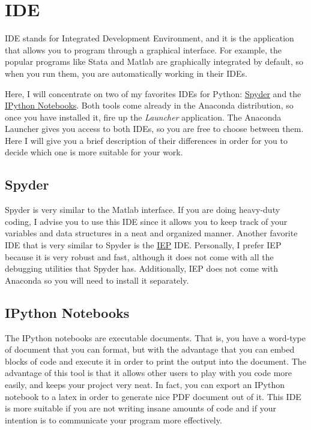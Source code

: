 \documentclass[11pt]{article}
\begin{document}
\section{IDE}

IDE stands for Integrated Development Environment, and it is the application that allows you to program through a graphical interface. For example, the popular programs like Stata and Matlab are graphically integrated by default, so when you run them, you are automatically working in their IDEs.
 
Here, I will concentrate on two of my favorites IDEs for Python: \href{https://pypi.python.org/pypi/spyder}{Spyder} and the \href{http://ipython.org/notebook.html}{IPython Notebooks}. Both tools come already in the Anaconda distribution, so once you have installed it, fire up the \emph{Launcher} application. The Anaconda Launcher gives you access to both IDEs, so you are free to choose between them. Here I will give you a brief description of their differences in order for you to decide which one is more suitable for your work.


\subsection{Spyder}
Spyder is very similar to the Matlab interface. If you are doing heavy-duty coding, I advise you to use this IDE since it allows you to keep track of your variables and data structures in a neat and organized manner. Another favorite IDE that is very similar to Spyder is the \href{http://www.iep-project.org/}{IEP} IDE. Personally, I prefer IEP because it is very robust and fast, although it does not come with all the debugging utilities that Spyder has. Additionally, IEP does not come with Anaconda so you will need to install it separately.


\subsection{IPython Notebooks}

The IPython notebooks are executable documents. That is, you have a word-type of document that you can format, but with the advantage that you can embed blocks of code and execute it in order to print the output into the document. The advantage of this tool is that it allows other users to play with you code more easily, and keeps your project very neat. In fact, you can export an IPython notebook to a latex in order to generate nice PDF document out of it. This IDE is more suitable if you are not writing insane amounts of code and if your intention is to communicate your program more effectively.
\end{document}
